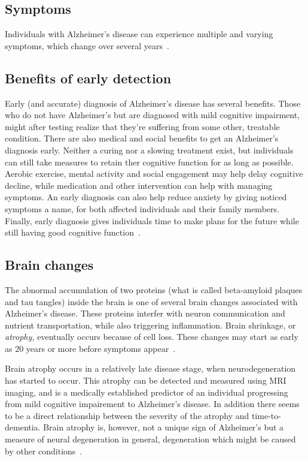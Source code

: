 \documentclass{kththesis}
\begin{document}
\subsection{Symptoms}
Individuals with Alzheimer's disease can experience multiple and varying symptoms, which change over several years~\cite{factsfigures2018}.

\subsection{Benefits of early detection}
Early (and accurate) diagnosis of Alzheimer's disease has several benefits. Those who do not have Alzheimer's but are diagnosed with mild cognitive impairment, might after testing realize that they're suffering from some other, treatable condition. There are also medical and social benefits to get an Alzheimer's diagnosis early. Neither a curing nor a slowing treatment exist, but individuals can still take measures to retain ther cognitive function for as long as possible. Aerobic exercise, mental activity and social engagement may help delay cognitive decline, while medication and other intervention can help with managing symptoms. An early diagnosis can also help reduce anxiety by giving noticed symptoms a name, for both affected individuals and their family members. Finally, early diagnosis gives individuals time to make plans for the future while still having good cognitive function~\cite[p. 406-409]{factsfigures2018}.

\subsection{Brain changes}
The abnormal accumulation of two proteins (what is called beta-amyloid plaques and tau tangles) inside the brain is one of several brain changes associated with Alzheimer's disease. These proteins interfer with neuron communication and nutrient transportation, while also triggering inflammation. Brain shrinkage, or \textit{atrophy,} eventually occurs because of cell loss. These changes may start as early as 20 years or more before symptoms appear~\cite{factsfigures2018}.

Brain atrophy occurs in a relatively late disease stage, when neurodegeneration has started to occur. This atrophy can be detected and measured using MRI imaging, and is a medically established predictor of an individual progressing from mild cognitive impairement to Alzheimer's disease. In addition there seems to be a direct relationship between the severity of the atrophy and time-to-dementia. Brain atrophy is, however, not a unique sign of Alzheimer's but a measure of neural degeneration in general, degeneration which might be caused by other conditions~\cite{jack2010brain}.
\end{document}
